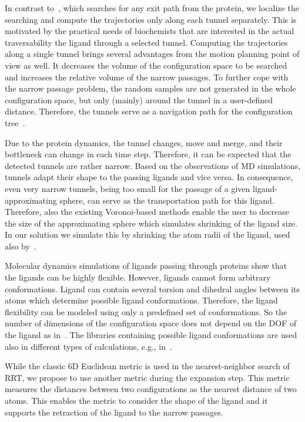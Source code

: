 \documentclass[usletter, 10pt, conference]{ieeeconf} %
\begin{document}
In contrast to~\cite{cortes2010simulating}, which searches for any exit path from the protein, we localize the searching and compute the trajectories only along each tunnel separately.
This is motivated by the practical needs of biochemists that are interested in the actual traversability the ligand through a selected tunnel.
Computing the trajectories along a single tunnel brings several advantages from the motion planning point of view as well.
It decreases the volume of the configuration space to be searched and increases the relative volume of the narrow passages.
To further cope with the narrow passage problem, the random samples are not generated in the whole configuration space, but only (mainly) around
the tunnel in a user-defined distance.
Therefore, the tunnels serve as a navigation path for the configuration tree~\cite{vonasek2009rrt}.

Due to the protein dynamics, the tunnel changes, move and merge, and their bottleneck can change in each time step.
Therefore, it can be expected that the detected tunnels are rather narrow.
Based on the observations of MD simulations, tunnels adapt their shape to the passing ligands and vice versa.
In consequence, even very narrow tunnels, being too small for the passage of a given ligand-approximating sphere, can serve as the transportation path for this ligand.
Therefore, also the existing Voronoi-based methods enable the user to decrease the size of the approximating sphere which simulates shrinking of the ligand size.
In our solution we simulate this by shrinking the atom radii of the ligand, used also by~\cite{cortes2010simulating,guieysse2008structure}.

Molecular dynamics simulations of ligands passing through proteins show that the ligands can be highly flexible.
However, ligands cannot form arbitrary conformations. 
Ligand can contain several torsion and dihedral angles between its atoms which determine possible ligand conformations.
Therefore, the ligand flexibility can be modeled using only a predefined set of conformations.
So the number of dimensions of the configuration space does not depend on the DOF of the ligand as in~\cite{cortes2010simulating}.
The libraries containing possible ligand conformations are used also in different types of calculations, e.g., in~\cite{kellogg}. 

While the classic 6D Euclidean metric is used in the nearest-neighbor search of RRT, we propose to use another metric during the expansion step.
This metric measures the distances between two configurations as the nearest distance of two atoms. 
This enables the metric to consider the shape of the ligand and it supports the retraction of the ligand to the narrow passages.
\end{document}
